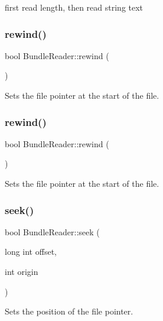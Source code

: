 first read length, then read string text \mbox{\label{classBundleReader_afae9c7d45bda94453c01ac6aeb821b07}} 
\subsubsection{\texorpdfstring{rewind()}{rewind()}\hspace{0.1cm}{\footnotesize\ttfamily [1/2]}}
{\footnotesize\ttfamily bool Bundle\+Reader\+::rewind (\begin{DoxyParamCaption}{ }\end{DoxyParamCaption})}

Sets the file pointer at the start of the file. \mbox{\label{classBundleReader_afae9c7d45bda94453c01ac6aeb821b07}} 
\subsubsection{\texorpdfstring{rewind()}{rewind()}\hspace{0.1cm}{\footnotesize\ttfamily [2/2]}}
{\footnotesize\ttfamily bool Bundle\+Reader\+::rewind (\begin{DoxyParamCaption}{ }\end{DoxyParamCaption})}

Sets the file pointer at the start of the file. \mbox{\label{classBundleReader_a6ac7f8410a0b94d63a74e547825e8203}} 
\subsubsection{\texorpdfstring{seek()}{seek()}\hspace{0.1cm}{\footnotesize\ttfamily [1/2]}}
{\footnotesize\ttfamily bool Bundle\+Reader\+::seek (\begin{DoxyParamCaption}\item[{long int}]{offset,  }\item[{int}]{origin }\end{DoxyParamCaption})}

Sets the position of the file pointer. \mbox{\label{classBundleReader_a6ac7f8410a0b94d63a74e547825e8203}} 
